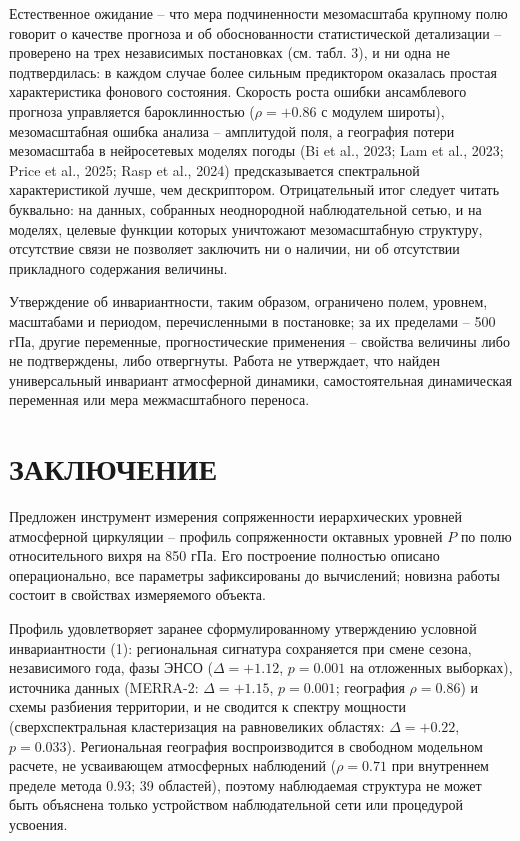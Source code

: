 \documentclass[12pt,a4paper]{article}
\begin{document}
Естественное ожидание -- что мера подчиненности мезомасштаба крупному полю говорит о качестве прогноза и об обоснованности статистической детализации -- проверено на трех независимых постановках (см. табл. 3), и ни одна не подтвердилась: в каждом случае более сильным предиктором оказалась простая характеристика фонового состояния. Скорость роста ошибки ансамблевого прогноза управляется бароклинностью ($\rho = +0.86$ с модулем широты), мезомасштабная ошибка анализа -- амплитудой поля, а география потери мезомасштаба в нейросетевых моделях погоды (Bi et al., 2023; Lam et al., 2023; Price et al., 2025; Rasp et al., 2024) предсказывается спектральной характеристикой лучше, чем дескриптором. Отрицательный итог следует читать буквально: на данных, собранных неоднородной наблюдательной сетью, и на моделях, целевые функции которых уничтожают мезомасштабную структуру, отсутствие связи не позволяет заключить ни о наличии, ни об отсутствии прикладного содержания величины.

Утверждение об инвариантности, таким образом, ограничено полем, уровнем, масштабами и периодом, перечисленными в постановке; за их пределами -- 500 гПа, другие переменные, прогностические применения -- свойства величины либо не подтверждены, либо отвергнуты. Работа не утверждает, что найден универсальный инвариант атмосферной динамики, самостоятельная динамическая переменная или мера межмасштабного переноса.

\section{ЗАКЛЮЧЕНИЕ}

Предложен инструмент измерения сопряженности иерархических уровней атмосферной циркуляции -- профиль сопряженности октавных уровней $P$ по полю относительного вихря на 850 гПа. Его построение полностью описано операционально, все параметры зафиксированы до вычислений; новизна работы состоит в свойствах измеряемого объекта.

Профиль удовлетворяет заранее сформулированному утверждению условной инвариантности (1): региональная сигнатура сохраняется при смене сезона, независимого года, фазы ЭНСО ($\Delta = +1.12$, $p = 0.001$ на отложенных выборках), источника данных (MERRA-2: $\Delta = +1.15$, $p = 0.001$; география $\rho = 0.86$) и схемы разбиения территории, и не сводится к спектру мощности (сверхспектральная кластеризация на равновеликих областях: $\Delta = +0.22$, $p = 0.033$). Региональная география воспроизводится в свободном модельном расчете, не усваивающем атмосферных наблюдений ($\rho = 0.71$ при внутреннем пределе метода 0.93; 39 областей), поэтому наблюдаемая структура не может быть объяснена только устройством наблюдательной сети или процедурой усвоения.
\end{document}
